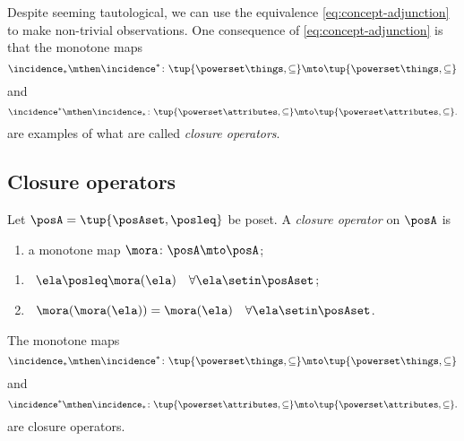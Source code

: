 Despite seeming tautological, we can use the equivalence \cref{eq:concept-adjunction} to make non-trivial observations. One consequence of \cref{eq:concept-adjunction} is that the monotone maps 
\begin{equation}
\incidence_* \mthen \incidence^* \colon \tup{\powerset \things, \subseteq} \mto \tup{\powerset \things, \subseteq}
\end{equation}
and 
\begin{equation}
\incidence^* \mthen \incidence_* \colon \tup{\powerset \attributes, \subseteq} \mto \tup{\powerset \attributes, \subseteq}.
\end{equation}
are examples of what are called \emph{closure operators}.


\subsection{Closure operators}

\begin{definition}
Let $\posA = \tup{\posAset, \posleq}$ be poset. A \emph{closure operator} on $\posA$ is

\constit
\begin{enumerate}
\item a monotone map $\mora \colon \posA \mto \posA$; 
\end{enumerate}

\condit
\begin{enumerate}
\item {} \  $\ela \posleq \mora(\ela) \quad \forall \ela \setin \posAset$;
\item {} \ $\mora (\mora(\ela)) =  \mora(\ela) \quad \forall \ela \setin \posAset$. 
\end{enumerate}



\end{definition}

\begin{lemma}
The monotone maps 
\begin{equation}
\incidence_* \mthen \incidence^* \colon \tup{\powerset \things, \subseteq} \mto \tup{\powerset \things, \subseteq}
\end{equation}
and 
\begin{equation}
\incidence^* \mthen \incidence_* \colon \tup{\powerset \attributes, \subseteq} \mto \tup{\powerset \attributes, \subseteq}.
\end{equation}
are closure operators. 
\end{lemma}

